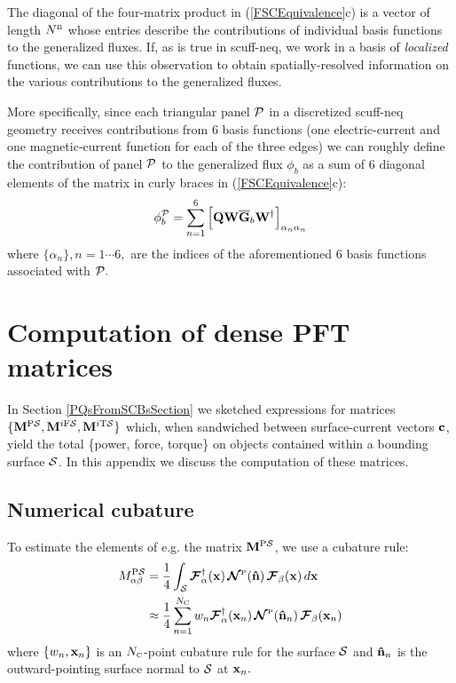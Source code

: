 \documentclass[letterpaper]{article}
\newcommand{\PS}{^{\text{\scriptsize P}\mc S}}
\newcommand{\IFS}{^{i\text{\scriptsize F}\mc S}}
\newcommand{\ITS}{^{i\text{\scriptsize T}\mc S}}
\begin{document}
The diagonal of the four-matrix product in (\ref{FSCEquivalence}c) 
is a vector of length $N^{\hbox{\tiny{B}}}$ whose entries describe the 
contributions of individual basis functions to the generalized
fluxes. If, as is true in {\sc scuff-neq}, we work in a basis
of \textit{localized} functions, we can use this observation 
to obtain spatially-resolved information on the various 
contributions to the generalized fluxes.

More specifically, since each triangular panel $\mathcal{P}$ 
in a discretized {\sc scuff-neq} geometry receives contributions 
from 6 basis functions (one electric-current and one magnetic-current
function for each of the three edges) we can roughly define the
contribution of panel $\mathcal{P}$ to the generalized flux $\phi_b$ 
as a sum of 6 diagonal elements of the matrix in curly braces
in (\ref{FSCEquivalence}c):
$$ \phi_{b}^{\mathcal{P}} 
   = 
   \sum_{n=1}^6
   \Big[\mathbf{Q} \mathbf{W} \overline{\mathbf{G}}_b \mathbf{W}^\dagger\Big]_{\alpha_n \alpha_n}
$$
where $\{\alpha_n\}, n=1\cdots 6,$ are the indices of the
aforementioned 6 basis functions associated with $\mathcal{P}.$

\appendix

\section{Computation of dense PFT matrices}

In Section \ref{PQsFromSCBsSection} we sketched expressions for
matrices $\{\vb M\PS, \vb M\IFS, \vb M\ITS\}$ which, when sandwiched
between surface-current vectors $\mathbf{c}$, yield the total
\{power, force, torque\} on objects contained within a bounding
surface $\mathcal{S}$. In this appendix we discuss the computation of 
these matrices.

\subsection{Numerical cubature}

To estimate the elements of e.g. the matrix $\vb M\PS$, we
use a cubature rule:
\begin{align}
  M_{\alpha\beta}\PS
 &= \frac{1}{4} \int_{\mc S} 
    \bmc F^\dagger_\alpha(\vb x) 
    \,
    \bmc N\supt{P}(\vbhat{n})
    \,
    \bmc F_\beta(\vb x) 
     \, d\vb x
\nn
 &\approx \frac{1}{4} \sum_{n=1}^{N\subt{C}} w_n 
    \bmc F^\dagger_\alpha(\vb x_n) 
    \,
    \bmc N\supt{P}(\vbhat{n}_n)
    \,
    \bmc F_\beta(\vb x_n) 
\label{MPSCubature}
\end{align}
where $\{w_n, \mathbf{x}_n\}$ is an $N_{\hbox{\tiny{C}}}$-point cubature rule 
for the surface $\mathcal{S}$ and $\mathbf{\hat n}_n$ is the outward-pointing
surface normal to $\mathcal{S}$ at $\mathbf{x}_n.$
 
\end{document}
